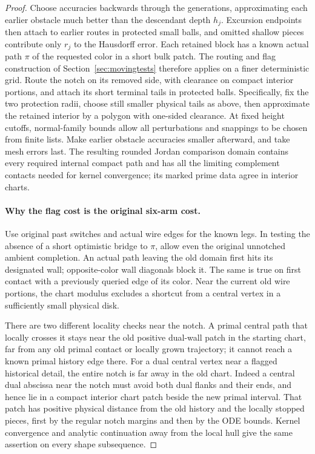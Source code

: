 \begin{proof}
Choose accuracies backwards through the generations, approximating
each earlier obstacle much better than the descendant depth $h_j$.
Excursion endpoints then attach to earlier routes in protected small
balls, and omitted shallow pieces contribute only $r_j$ to the
Hausdorff error.  Each retained block has a known actual path $\pi$ of
the requested color in a short bulk patch.  The routing and flag
construction of Section~\ref{sec:movingtests} therefore applies on a
finer deterministic grid.  Route the notch on its removed side, with
clearance on compact interior portions, and attach its short terminal
tails in protected balls.  Specifically, fix the two protection radii,
choose still smaller physical tails as above, then approximate the
retained interior by a polygon with one-sided clearance.  At fixed
height cutoffs, normal-family bounds allow all perturbations and
snappings to be chosen from finite lists.  Make earlier obstacle
accuracies smaller afterward, and take mesh errors last.  The resulting
rounded Jordan comparison domain contains every required internal
compact path and has all the limiting complement contacts needed for
kernel convergence; its marked prime data agree in interior charts.

\paragraph{Why the flag cost is the original six-arm cost.}
Use original past switches and actual wire edges for the known legs.
In testing the absence of a short optimistic bridge to $\pi$, allow
even the original unnotched ambient completion.  An actual path leaving
the old domain first hits its designated wall; opposite-color wall
diagonals block it.  The same is true on first contact with a previously
queried edge of its color.  Near the current old wire portions, the
chart modulus excludes a shortcut from a central vertex in a
sufficiently small physical disk.

There are two different locality checks near the notch.  A primal
central path that locally crosses it stays near the old positive
dual-wall patch in the starting chart, far from any old primal contact
or locally grown trajectory; it cannot reach a known primal history
edge there.  For a dual central vertex near a flagged historical
detail, the entire notch is far away in the old chart.  Indeed a
central dual abscissa near the notch must avoid both dual flanks and
their ends, and hence lie in a compact interior chart patch beside the
new primal interval.  That patch has positive physical distance from
the old history and the locally stopped pieces, first by the regular
notch margins and then by the ODE bounds.  Kernel convergence and
analytic continuation away from the local hull give the same assertion
on every shape subsequence.


\end{proof}
